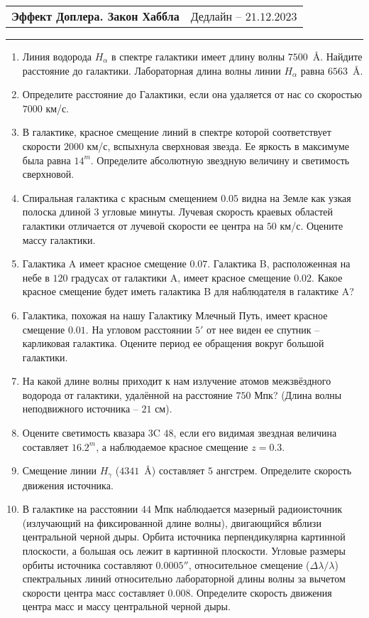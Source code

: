 \documentclass[12pt]{article}
\begin{document}
\begin{tabularx}{\textwidth}{Xr}
{\Large \textbf{Эффект Доплера. Закон Хаббла}} & Дедлайн -- $21.12.2023$ \\
\end{tabularx}
\noindent\rule{\textwidth}{0.4pt}
    \begin{enumerate}
        \item Линия водорода $H_{\alpha}$  в спектре галактики имеет длину волны $7500$~\AA. Найдите расстояние до галактики. Лабораторная длина волны линии $H_{\alpha}$ равна $6563$~\AA.
        \item Определите расстояние до Галактики, если она удаляется от нас со скоростью $7000$ км/с.
        \item В галактике, красное смещение линий в спектре которой соответствует скорости $2000$ км/с, вспыхнула сверхновая звезда. Ее яркость в максимуме была равна $14^m$. Определите абсолютную звездную величину и светимость сверхновой.
        \item Спиральная галактика с красным смещением $0.05$ видна на Земле как узкая полоска длиной $3$ угловые минуты. Лучевая скорость краевых областей галактики отличается от лучевой скорости ее центра на $50$ км/с. Оцените массу галактики.
        \item Галактика A имеет красное смещение $0.07$. Галактика B, расположенная на небе в $120$ градусах от галактики A, имеет красное смещение $0.02$. Какое красное смещение будет иметь галактика B для наблюдателя в галактике A? 
        \item Галактика, похожая на нашу Галактику Млечный Путь, имеет красное смещение $0.01$. На угловом расстоянии $5'$ от нее виден ее спутник -- карликовая галактика. Оцените период ее обращения вокруг большой галактики.
        \item На какой длине волны приходит к нам излучение атомов межзвёздного водорода от галактики, удалённой на расстояние $750$ Мпк? (Длина волны неподвижного источника -- $21$ см).
        \item Оцените светимость квазара $3$C $48$, если его видимая звездная величина составляет $16.2^m$, а наблюдаемое красное смещение $z=0.3$.
        \item Смещение линии $H_{\gamma}$ ($4341$~\AA) составляет $5$ ангстрем. Определите скорость движения источника.
        \item В галактике на расстоянии $44$ Мпк наблюдается мазерный радиоисточник (излучающий	на фиксированной длине волны), двигающийся вблизи центральной черной дыры. Орбита источника перпендикулярна картинной плоскости, а большая ось лежит в картинной плоскости. Угловые размеры орбиты источника составляют $0.0005''$, относительное смещение ($\Delta \lambda/\lambda$) спектральных линий относительно лабораторной длины волны за вычетом скорости центра масс составляет $0.008$. Определите скорость движения центра масс и массу центральной черной дыры.
    \end{enumerate}
\end{document}
